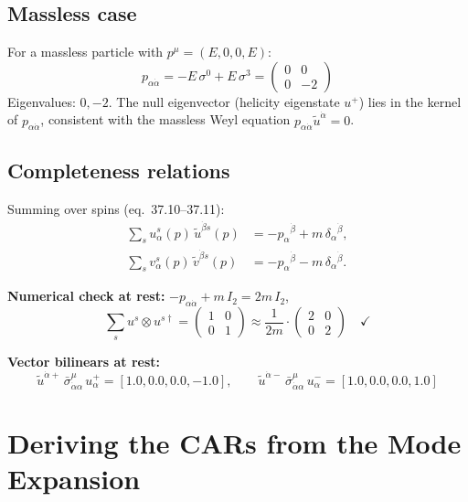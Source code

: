 \subsection{Massless case}

For a massless particle with $p^\mu = (E,0,0,E)$:
\[
  p_{\alpha\dot\alpha}
  = -E\,\sigma^0 + E\,\sigma^3
  = \begin{pmatrix}0 & 0 \\ 0 & -2\end{pmatrix}
\]
Eigenvalues: $0, -2$.
The null eigenvector (helicity eigenstate $u^+$) lies in the kernel of
$p_{\alpha\dot\alpha}$, consistent with the massless Weyl equation
$p_{\alpha\dot\alpha}\tilde u^{\dot\alpha} = 0$.

\subsection{Completeness relations}

Summing over spins (eq.~37.10--37.11):
\begin{align}
  \sum_s u^s_\alpha(p)\,\tilde u^{\dot\beta s}(p) &= -p_{\alpha}{}^{\dot\beta} + m\,\delta_\alpha{}^{\dot\beta},
  \tag{37.10}\\
  \sum_s v^s_\alpha(p)\,\tilde v^{\dot\beta s}(p) &= -p_{\alpha}{}^{\dot\beta} - m\,\delta_\alpha{}^{\dot\beta}.
  \tag{37.11}
\end{align}

\textbf{Numerical check at rest:} $-p_{\alpha\dot\alpha} + m\,I_2 = 2m\,I_2$,
\[
  \sum_s u^s\otimes u^{s\dagger} = \begin{pmatrix}1 & 0 \\ 0 & 1\end{pmatrix}
  \approx \frac{1}{2m}\cdot \begin{pmatrix}2 & 0 \\ 0 & 2\end{pmatrix} \quad\checkmark
\]

\textbf{Vector bilinears at rest:}
\[
  \tilde u^{\dot\alpha +}\,\bar\sigma^\mu_{\dot\alpha\alpha}\,u^+_\alpha
  = [1.0, 0.0, 0.0, -1.0],\qquad
  \tilde u^{\dot\alpha -}\,\bar\sigma^\mu_{\dot\alpha\alpha}\,u^-_\alpha
  = [1.0, 0.0, 0.0, 1.0]
\]

\section{Deriving the CARs from the Mode Expansion}


